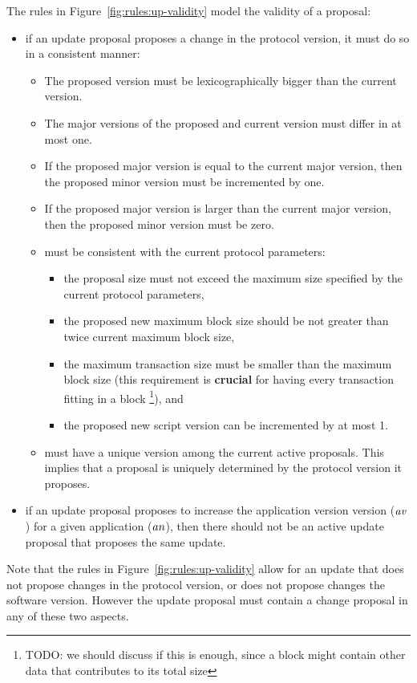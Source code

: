 The rules in Figure~\ref{fig:rules:up-validity} model the validity of a proposal:
\begin{itemize}
\item if an update proposal proposes a change in the protocol version, it must
  do so in a consistent manner:
  \begin{itemize}
  \item The proposed version must be lexicographically bigger than the
    current version.
  \item The major versions of the proposed and current version must differ in
    at most one.
  \item If the proposed major version is equal to the current major
    version, then the proposed minor version must be incremented by one.
  \item If the proposed major version is larger than the current major version,
    then the proposed minor version must be zero.
  \item must be consistent with the current protocol parameters:
    \begin{itemize}
    \item the proposal size must not exceed the maximum size specified by
      the current protocol parameters,
    \item the proposed new maximum block size should be not greater than twice
      current maximum block size,
    \item the maximum transaction size must be smaller than the maximum block
      size (this requirement is \textbf{crucial} for having every transaction
      fitting in a block \footnote{TODO: we should discuss if this is enough,
        since a block might contain other data that contributes to its total
        size}), and
    \item the proposed new script version can be incremented by at most 1.
    \end{itemize}
  \item must have a unique version among the current active proposals. This
    implies that a proposal is uniquely determined by the protocol version it
    proposes.
  \end{itemize}
\item if an update proposal proposes to increase the application version
  version ($\mathit{av}$) for a given application ($\mathit{an}$), then there should
  not be an active update proposal that proposes the same update.
\end{itemize}
Note that the rules in Figure~\ref{fig:rules:up-validity} allow for an update
that does not propose changes in the protocol version, or does not propose
changes the software version. However the update proposal must contain a change
proposal in any of these two aspects.
%


